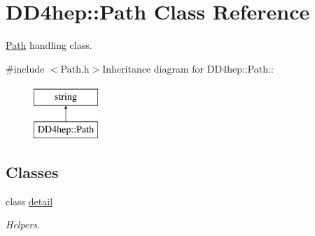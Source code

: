 \hypertarget{class_d_d4hep_1_1_path}{
\section{DD4hep::Path Class Reference}
\label{class_d_d4hep_1_1_path}
}


\hyperlink{class_d_d4hep_1_1_path}{Path} handling class.  


{\ttfamily \#include $<$Path.h$>$}Inheritance diagram for DD4hep::Path::\begin{figure}[H]
\begin{center}
\leavevmode
\includegraphics[height=2cm]{class_d_d4hep_1_1_path}
\end{center}
\end{figure}
\subsection*{Classes}
\begin{DoxyCompactItemize}
\item 
class \hyperlink{class_d_d4hep_1_1_path_1_1detail}{detail}
\begin{DoxyCompactList}\small\item\em Helpers. \item\end{DoxyCompactList}\end{DoxyCompactItemize}
